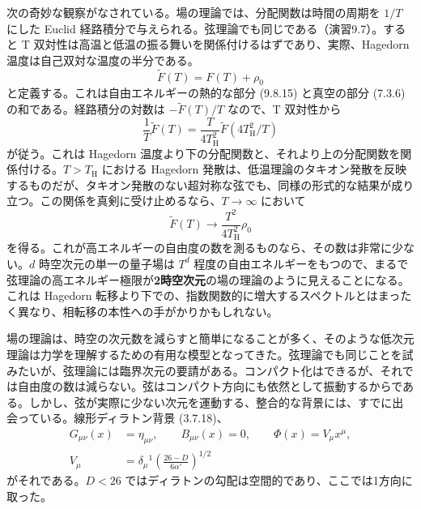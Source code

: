 次の奇妙な観察がなされている。場の理論では、分配関数は時間の周期を $1/T$ にした Euclid 経路積分で与えられる。弦理論でも同じである（演習9.7）。すると T 双対性は高温と低温の振る舞いを関係付けるはずであり、実際、Hagedorn 温度は自己双対な温度の半分である。
\begin{equation}
\widetilde F(T)=F(T)+\rho_0
\tag{9.8.18}\label{eq:9.8.18}
\end{equation}
と定義する。これは自由エネルギーの熱的な部分 (9.8.15) と真空の部分 (7.3.6) の和である。経路積分の対数は $-\widetilde F(T)/T$ なので、T 双対性から
\begin{equation}
\frac1T\widetilde F(T)
=\frac{T}{4T_{\mathrm H}^2}
\widetilde F(4T_{\mathrm H}^2/T)
\tag{9.8.19}\label{eq:9.8.19}
\end{equation}
が従う。これは Hagedorn 温度より下の分配関数と、それより上の分配関数を関係付ける。$T>T_{\mathrm H}$ における Hagedorn 発散は、低温理論のタキオン発散を反映するものだが、タキオン発散のない超対称な弦でも、同様の形式的な結果が成り立つ。この関係を真剣に受け止めるなら、$T\to\infty$ において
\begin{equation}
\widetilde F(T)\longrightarrow\frac{T^2}{4T_{\mathrm H}^2}\rho_0
\tag{9.8.20}\label{eq:9.8.20}
\end{equation}
を得る。これが高エネルギーの自由度の数を測るものなら、その数は非常に少ない。$d$ 時空次元の単一の量子場は $T^d$ 程度の自由エネルギーをもつので、まるで弦理論の高エネルギー極限が\textbf{2時空次元}の場の理論のように見えることになる。これは Hagedorn 転移より下での、指数関数的に増大するスペクトルとはまったく異なり、相転移の本性への手がかりかもしれない。

\label{sec:9.9}

場の理論は、時空の次元数を減らすと簡単になることが多く、そのような低次元理論は力学を理解するための有用な模型となってきた。弦理論でも同じことを試みたいが、弦理論には臨界次元の要請がある。コンパクト化はできるが、それでは自由度の数は減らない。弦はコンパクト方向にも依然として振動するからである。しかし、弦が実際に少ない次元を運動する、整合的な背景には、すでに出会っている。線形ディラトン背景 (3.7.18)、
\begin{align}
G_{\mu\nu}(x)&=\eta_{\mu\nu},\qquad
B_{\mu\nu}(x)=0,\qquad\Phi(x)=V_\mu x^\mu,
\tag{9.9.1a}\label{eq:9.9.1a}\\
V_\mu&=\delta_\mu{}^1\left(\frac{26-D}{6\alpha'}\right)^{1/2}
\tag{9.9.1b}\label{eq:9.9.1b}
\end{align}
がそれである。$D<26$ ではディラトンの勾配は空間的であり、ここでは1方向に取った。

